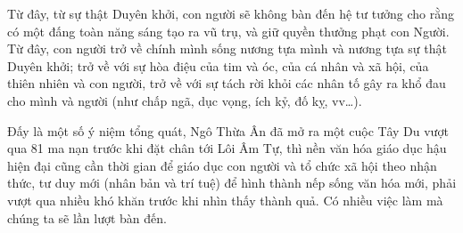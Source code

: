 Từ đây, từ sự thật Duyên khởi, con người sẽ không bàn đến hệ tư tưởng cho rằng có một đấng toàn năng sáng tạo ra vũ trụ, và giữ quyền thưởng phạt con Người. Từ đây, con người trở về chính mình sống nương tựa mình và nương tựa sự thật Duyên khởi; trở về với sự hòa điệu của tim và óc, của cá nhân và xã hội, của thiên nhiên và con người, trở về với sự tách rời khỏi các nhân tố gây ra khổ đau cho mình và người (như chấp ngã, dục vọng, ích kỷ, đố kỵ, vv\ldots).

Đấy là một số ý niệm tổng quát, Ngô Thừa Ân đã mở ra một cuộc Tây Du vượt qua 81 ma nạn trước khi đặt chân tới Lôi Âm Tự, thì nền văn hóa giáo dục hậu hiện đại cũng cần thời gian để giáo dục con người và tổ chức xã hội theo nhận thức, tư duy mới (nhân bản và trí tuệ) để hình thành nếp sống văn hóa mới, phải vượt qua nhiều khó khăn trước khi nhìn thấy thành quả. Có nhiều việc làm mà chúng ta sẽ lần lượt bàn đến.


